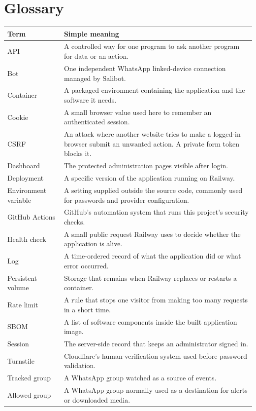 \documentclass[11pt,a4paper]{article}
\begin{document}
\section{Glossary}

\begin{longtable}{p{}p{}}
\toprule
\textbf{Term} & \textbf{Simple meaning}\\
\midrule
\endhead
API & A controlled way for one program to ask another program for data or an action.\\
Bot & One independent WhatsApp linked-device connection managed by Salibot.\\
Container & A packaged environment containing the application and the software it needs.\\
Cookie & A small browser value used here to remember an authenticated session.\\
CSRF & An attack where another website tries to make a logged-in browser submit an unwanted action. A private form token blocks it.\\
Dashboard & The protected administration pages visible after login.\\
Deployment & A specific version of the application running on Railway.\\
Environment variable & A setting supplied outside the source code, commonly used for passwords and provider configuration.\\
GitHub Actions & GitHub's automation system that runs this project's security checks.\\
Health check & A small public request Railway uses to decide whether the application is alive.\\
Log & A time-ordered record of what the application did or what error occurred.\\
Persistent volume & Storage that remains when Railway replaces or restarts a container.\\
Rate limit & A rule that stops one visitor from making too many requests in a short time.\\
SBOM & A list of software components inside the built application image.\\
Session & The server-side record that keeps an administrator signed in.\\
Turnstile & Cloudflare's human-verification system used before password validation.\\
Tracked group & A WhatsApp group watched as a source of events.\\
Allowed group & A WhatsApp group normally used as a destination for alerts or downloaded media.\\
\bottomrule
\end{longtable}
\end{document}
